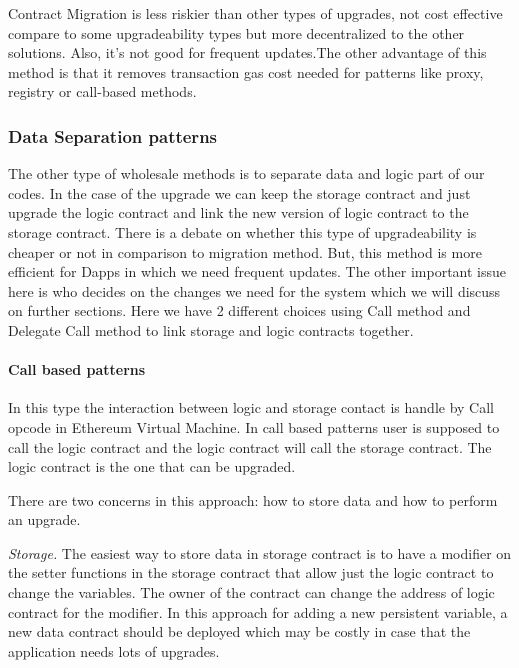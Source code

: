 Contract Migration is less riskier than other types of upgrades, not cost effective compare to some upgradeability types but more decentralized to the other solutions. Also, it's not good for frequent updates.The other advantage of this method is that it removes transaction gas cost needed for patterns like proxy, registry or call-based methods.




\subsubsection{Data Separation patterns}
The other type of wholesale methods is to separate data and logic part of our codes. In the case of the upgrade we can  keep the storage contract and just upgrade the logic contract and link the new version of logic contract to the storage contract.
There is a debate on whether this type of upgradeability is cheaper or not in comparison to migration method. But, this method is more efficient for Dapps in which we need frequent updates. The other important issue here is who decides on the changes we need for the system which we will discuss on further sections.
Here we have 2 different choices using Call method and Delegate Call method to link storage and logic contracts together.

\paragraph{Call based patterns}

In this type the interaction between logic and storage contact is handle by Call opcode in Ethereum Virtual Machine. In call based patterns user is supposed to call the logic contract and the logic contract will call the storage contract. The logic contract is the one that can be upgraded.

There are two concerns in this approach: how to store data and how to perform an upgrade.

\textit{Storage. } The easiest way to store data in storage contract is to have a modifier on the setter functions in the storage contract that allow just the logic contract to change the variables. The owner of the contract can change the address of logic contract for the modifier.
In this approach for adding a new persistent variable, a new data contract should be deployed which may be costly in case that the application needs lots of upgrades.

